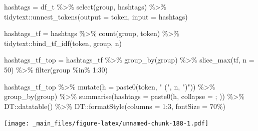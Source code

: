 \documentclass[
]{book}
\newenvironment{Shaded}{\begin{snugshade}}{\end{snugshade}}
\newcommand{\AttributeTok}[1]{\textcolor[rgb]{0.77,0.63,0.00}{#1}}
\newcommand{\DecValTok}[1]{\textcolor[rgb]{0.00,0.00,0.81}{#1}}
\newcommand{\FunctionTok}[1]{\textcolor[rgb]{0.00,0.00,0.00}{#1}}
\newcommand{\NormalTok}[1]{#1}
\newcommand{\OtherTok}[1]{\textcolor[rgb]{0.56,0.35,0.01}{#1}}
\newcommand{\SpecialCharTok}[1]{\textcolor[rgb]{0.00,0.00,0.00}{#1}}
\newcommand{\StringTok}[1]{\textcolor[rgb]{0.31,0.60,0.02}{#1}}
\begin{document}
\begin{Shaded}
\begin{Highlighting}[]
\NormalTok{hashtags }\OtherTok{=}\NormalTok{ df\_t }\SpecialCharTok{\%\textgreater{}\%} \FunctionTok{select}\NormalTok{(group, hashtags) }\SpecialCharTok{\%\textgreater{}\%}\NormalTok{ tidytext}\SpecialCharTok{::}\FunctionTok{unnest\_tokens}\NormalTok{(}\AttributeTok{output =}\NormalTok{ token, }\AttributeTok{input =}\NormalTok{ hashtags)}

\NormalTok{hashtags\_tf }\OtherTok{=}\NormalTok{ hashtags }\SpecialCharTok{\%\textgreater{}\%} \FunctionTok{count}\NormalTok{(group, token) }\SpecialCharTok{\%\textgreater{}\%}\NormalTok{ tidytext}\SpecialCharTok{::}\FunctionTok{bind\_tf\_idf}\NormalTok{(token, group, n)}

\NormalTok{hashtags\_tf\_top }\OtherTok{=}\NormalTok{ hashtags\_tf }\SpecialCharTok{\%\textgreater{}\%} \FunctionTok{group\_by}\NormalTok{(group) }\SpecialCharTok{\%\textgreater{}\%} \FunctionTok{slice\_max}\NormalTok{(tf, }\AttributeTok{n =} \DecValTok{50}\NormalTok{) }\SpecialCharTok{\%\textgreater{}\%} \FunctionTok{filter}\NormalTok{(group }\SpecialCharTok{\%in\%} \DecValTok{1}\SpecialCharTok{:}\DecValTok{30}\NormalTok{)}
\end{Highlighting}
\end{Shaded}

\begin{Shaded}
\begin{Highlighting}[]
\NormalTok{hashtags\_tf\_top }\SpecialCharTok{\%\textgreater{}\%} 
  \FunctionTok{mutate}\NormalTok{(}\AttributeTok{h =} \FunctionTok{paste0}\NormalTok{(token, }\StringTok{" ("}\NormalTok{, n, }\StringTok{")"}\NormalTok{)) }\SpecialCharTok{\%\textgreater{}\%} 
  \FunctionTok{group\_by}\NormalTok{(group) }\SpecialCharTok{\%\textgreater{}\%} \FunctionTok{summarise}\NormalTok{(}\AttributeTok{hashtags =} \FunctionTok{paste0}\NormalTok{(h, }\AttributeTok{collapse =} \StringTok{\textquotesingle{}; \textquotesingle{}}\NormalTok{)) }\SpecialCharTok{\%\textgreater{}\%} 
\NormalTok{  DT}\SpecialCharTok{::}\FunctionTok{datatable}\NormalTok{() }\SpecialCharTok{\%\textgreater{}\%} 
\NormalTok{  DT}\SpecialCharTok{::}\FunctionTok{formatStyle}\NormalTok{(}\AttributeTok{columns =} \DecValTok{1}\SpecialCharTok{:}\DecValTok{3}\NormalTok{, }\AttributeTok{fontSize =} \StringTok{\textquotesingle{}70\%\textquotesingle{}}\NormalTok{)}
\end{Highlighting}
\end{Shaded}

\texttt{[image: \_main\_files/figure-latex/unnamed-chunk-188-1.pdf]}
\end{document}
